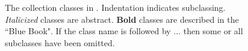 \documentclass[a4paper,10pt,twoside]{book}
\begin{document}
\begin{figure}
\begin{center}

\caption{The collection classes in \squeak. Indentation indicates subclassing.
\textit{\textsf{Italicized}} classes are abstract.
{\textbf{Bold}} classes are described in the ``Blue Book".
If the class name is followed by ... then some or all subclasses have been omitted.}
\label{fig:CollClassesList}
\end{center}
\end{figure}

\end{document}
